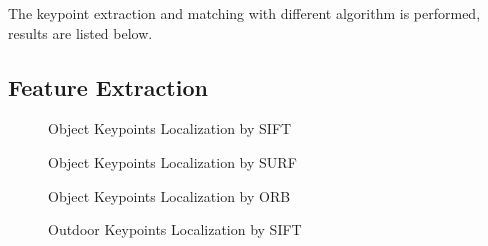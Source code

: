 \documentclass[paper=a4, fontsize=11pt]{scrartcl} %
\numberwithin{equation}{section} %
\numberwithin{figure}{section} %
\numberwithin{table}{section} %
\begin{document}
The keypoint extraction and matching with different algorithm is performed, results are listed below. 

\subsection{Feature Extraction}


\begin{figure}[htbp]
\centering
{}
\hspace{1in}
\caption{Object Keypoints Localization by SIFT}
\label{fig:object1-sift} %
\end{figure}
 

\begin{figure}[htbp]
\centering
{}
\hspace{1in}
\caption{Object Keypoints Localization by SURF}
\label{fig:object1-surf} %
\end{figure}
 

\begin{figure}[htbp]
\centering
{}
\hspace{1in}
\caption{Object Keypoints Localization by ORB}
\label{fig:object1-orb} %
\end{figure}
 

\begin{figure}[htbp]
\centering
{}
\hspace{1in}
\caption{Outdoor Keypoints Localization by SIFT}
\label{fig:indoor1-sift} %
\end{figure}
 
\end{document}
